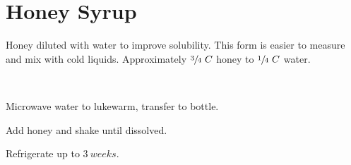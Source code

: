 \section{Honey Syrup}

\begin{recipestats}[
        servings=$1~C$,
        preptime=5~\minute,
        source=Mike \& Jane,
        original=\citefield{cocktailSeminars2021}{title} \cite{cocktailSeminars2021},
    ]
\end{recipestats}

\begin{recipeabstract}
    Honey diluted with water to improve solubility.
    This form is easier to measure and mix with cold liquids.
    Approximately $\sfrac{3}{4}~C$ honey to $\sfrac{1}{4}~C$ water.
\end{recipeabstract}

\begin{ingredientcolumns}[1]
    \begin{ingredientblock}
        \\
    \end{ingredientblock}
\end{ingredientcolumns}

\begin{preparation}
\item Microwave water to lukewarm, transfer to bottle.
\item Add honey and shake until dissolved.
\item Refrigerate up to $3~weeks$.
\end{preparation}

\recipeend
